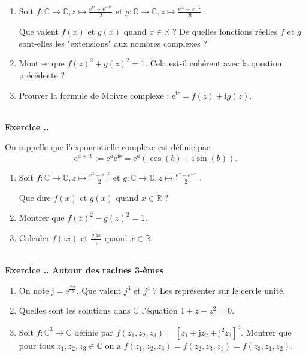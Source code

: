\documentclass{article}
\newcommand{\mb}[1]{\mathbb{#1}}
\newcounter{exo}
\newcommand{\exercice}[1][\null]{\textbf{\\ \large Exercice \thesection.\theexo. \normalsize #1} \addtocounter{exo}{1}}
\begin{document}
\begin{enumerate}


\item Soit $f: \mb{C} \rightarrow \mb{C}, z \mapsto \frac{\text{e}^{\text{i}z}+\text{e}^{-\text{i}z}}{2}$ et $g: \mb{C} \rightarrow \mb{C}, z \mapsto \frac{\text{e}^{\text{i}z}-\text{e}^{-\text{i}z}}{2\text{i}}$ .

Que valent $f(x)$ et $g(x)$ quand $x \in \mb{R}$ ? De quelles fonctions réelles $f$ et $g$ sont-elles les "extensions" aux nombres complexes ?

\item Montrer que $f(z)^2 + g(z)^2 = 1$. Cela est-il cohérent avec la question précédente ?

\item Prouver la formule de Moivre complexe : $\text{e}^{\text{i}z} = f(z) + \text{i} g(z)$.

\end{enumerate}




\exercice


On rappelle que l'exponentielle complexe est définie par $$\text{e}^{a+\text{i}b} := \text{e}^{a} \text{e}^{\text{i}b} = \text{e}^{a} (\cos(b) + \text{i} \sin(b)).$$
\begin{enumerate}


\item Soit $f: \mb{C} \rightarrow \mb{C}, z \mapsto \frac{\text{e}^{z}+\text{e}^{-z}}{2}$ et $g: \mb{C} \rightarrow \mb{C}, z \mapsto \frac{\text{e}^{z}-\text{e}^{-z}}{2}$ .

Que dire $f(x)$ et $g(x)$ quand $x \in \mb{R}$ ?

\item Montrer que $f(z)^2 - g(z)^2 = 1$.

\item Calculer $f(\text{i} x)$ et  $\frac{g(\text{i} x}{\text{i}}$ quand $x \in \mb{R}$.

\end{enumerate}





\exercice[Autour des racines 3-èmes]

\begin{enumerate}

\item On note $\text{j} = \text{e}^{\frac{2 \text{i} \pi}{3}}$. Que valent $j^3$ et $j^4$ ? Les représenter sur le cercle unité.

\item Quelles sont les solutions dans $\mb{C}$ l'équation $1 + z + z^2 = 0$.

\item Soit $f : \mb{C}^3 \rightarrow \mb{C}$ définie par $f(z_1, z_2, z_3) = \left[z_1 + \text{j} z_2 + \text{j}^2 z_3\right]^3$. Montrer que pour tous $z_1, z_2, z_3 \in \mb{C}$ on a $f(z_1, z_2, z_3) = f(z_2, z_3, z_1) = f(z_3, z_1, z_2)$.

\end{enumerate}
\end{document}
